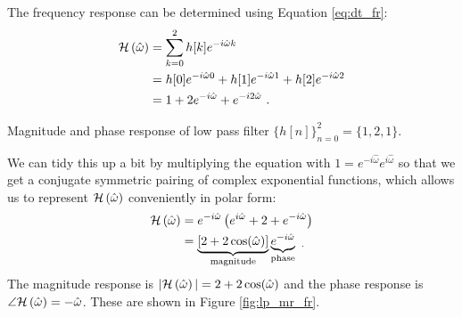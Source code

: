 The frequency response can be determined using Equation \ref{eq:dt_fr}:
\begin{align}
\mathcal{H}\left(\hat{\omega}\right) &= \sum_{k=0}^{2} h[k] e^{-i\hat{\omega}k}\\
    &= h[0]e^{-i\hat{\omega}0} + h[1]e^{-i\hat{\omega}1} + h[2]e^{-i\hat{\omega}2}\\
    &= 1 + 2 e^{-i\hat{\omega}} + e^{-i2\hat{\omega}} \,\,.
\end{align}
\begin{marginfigure}
\begin{center}
\end{center}
\caption{Magnitude and phase response of low pass filter $\{h[n]\}_{n=0}^{2} = \{1,2,1\}$.}
\label{fig:lp_mr_fr}
\end{marginfigure}
\noindent We can tidy this up a bit by multiplying the equation with
$1=e^{-i\hat{\omega}}e^{i\hat{\omega}}$ so that we get a conjugate
symmetric pairing of complex exponential functions, which allows us to
represent $\mathcal{H}\left(\hat{\omega}\right)$ conveniently in polar form:
\begin{align}
\mathcal{H}\left(\hat{\omega}\right) &=  e^{-i\hat{\omega}}\left(e^{i\hat{\omega}} + 2 + e^{-i\hat{\omega}}\right)\\
    &= \underbrace{[2+2\cos(\hat{\omega})]}_{\mathrm{magnitude}}\underbrace{e^{-i\hat{\omega}}}_{\mathrm{phase}} \,\, _.
\end{align}
The magnitude response is $|\mathcal{H}\left(\hat{\omega}\right)|=2+2\cos(\hat{\omega})$ and the phase
response is $\angle \mathcal{H}\left(\hat{\omega}\right) = -\hat{\omega}$. These are shown in
Figure \ref{fig:lp_mr_fr}.

